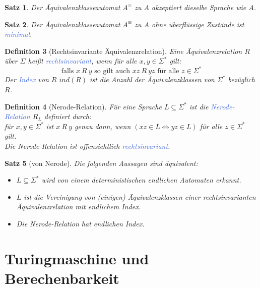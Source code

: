 \documentclass[11pt]{article}
\newcommand{\tcol}[1]{\textcolor{RoyalBlue}{#1}}
\theoremstyle{break}
\newtheorem{satz}{Satz}[section]
\newtheorem{defi}[satz]{Definition}
\begin{document}
    \begin{satz}
        Der Äquivalenzklasseautomat $A^\equiv$ zu $A$ akzeptiert dieselbe Sprache wie $A$.
    \end{satz}

    \begin{satz}
        Der Äquivalenzklasseautomat $A^\equiv$ zu $A$ ohne überflüssige Zustände ist \tcol{minimal}.
    \end{satz}

    \begin{defi}[Rechtsinvariante Äquivalenzrelation]
        Eine Äquivalenzrelation $R$ über $\Sigma$ heißt \tcol{rechtsinvariant}, wenn für alle $x,y\in\Sigma^*$ gilt:
        \[\text{falls } x\ R\ y\text{ so gilt auch }xz\ R\ yz\text{ für alle } z\in\Sigma^*\]
        Der \tcol{Index} von $R$ $ind(R)$ ist die Anzahl der Äquivalenzklassen von $\Sigma^*$ bezüglich $R$.
    \end{defi}

    \begin{defi}[Nerode-Relation]
        Für eine Sprache $L\subseteq\Sigma^*$ ist die \tcol{Nerode-Relation} $R_L$ definiert durch:\\
        für $x,y\in\Sigma^*$ ist $x\ R\ y$ genau dann, wenn $(xz\in L\Leftrightarrow yz\in L)$ für alle $z\in\Sigma^*$ gilt.\\
        Die Nerode-Relation ist offensichtlich \tcol{rechtsinvariant}.
    \end{defi}

    \begin{satz}[von Nerode]
        Die folgenden Aussagen sind äquivalent:
        \begin{itemize}
            \item $L\subseteq\Sigma^*$ wird von einem deterministischen endlichen Automaten erkannt.
            \item $L$ ist die Vereinigung von (einigen) Äquivalenzklassen einer rechtsinvarianten Äquivalenzrelation mit endlichem Index.
            \item Die Nerode-Relation hat endlichen Index.
        \end{itemize}
    \end{satz}



    \section{Turingmaschine und Berechenbarkeit}
	\label{sec:turingmaschineindexund-berechenbarkeit}
\end{document}
